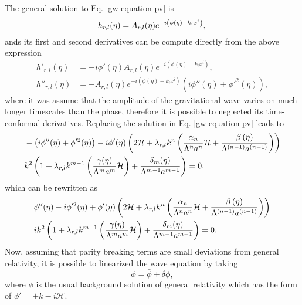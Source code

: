 \documentclass{article}
\begin{document}
The general solution to Eq. \eqref{gw equation pv} is
\begin{equation}
    h_{r,l}(\eta)  = A_{r,l}(\eta)e^{-i\left(\phi(\eta) -k_{i}x^{i}\right)}, \\
\end{equation} 
ands its first and second derivatives can be compute directly from the above expression 
\begin{align}
    h'_{r,l}(\eta) & = -i\phi'(\eta)A_{r,l}(\eta)e^{-i\left(\phi(\eta) -k_{i}x^{i}\right)}, \\
    h''_{r,l}(\eta) & = -A_{r,l}(\eta)e^{-i\left(\phi(\eta) -k_{i}x^{i}\right)} 
    \left(i\phi''(\eta) + \phi'^{2}(\eta)\right),
\end{align} 
where it was assume that the amplitude of the gravitational wave varies 
on much longer timescales than the phase, therefore it is possible to neglected its 
time-conformal derivatives. Replacing the solution in Eq. \eqref{gw equation pv} leads to
\begin{align}
    & -\left(i\phi''(\eta) + \phi'^{2}(\eta)\right) -i\phi'(\eta)
    \left(2\mathcal{H} + \lambda_{r,l}k^{n}
    \left(\frac{\alpha_{n}}{\Lambda^n a^n}\mathcal{H} + 
    \frac{\beta\left(\eta\right)}{\Lambda^{(n-1)}a^{(n-1)}}\right)\right) \notag \\
    & k^2 \left(1 + \lambda_{r,l}k^{m-1}
    \left(\frac{\gamma(\eta)}{\Lambda^m a^m}\mathcal{H}\right) 
    + \frac{\delta_{m}(\eta)}{\Lambda^{m-1}a^{m-1}}\right) = 0.
\end{align}
which can be rewritten as
\begin{align}
    & \phi''(\eta) - i\phi'^{2}(\eta) + \phi'(\eta)
    \left(2\mathcal{H} + \lambda_{r,l}k^{n}
    \left(\frac{\alpha_{n}}{\Lambda^n a^n}\mathcal{H} + 
    \frac{\beta\left(\eta\right)}{\Lambda^{(n-1)}a^{(n-1)}}\right)\right) \notag \\
    & i k^2 \left(1 + \lambda_{r,l}k^{m-1}
    \left(\frac{\gamma(\eta)}{\Lambda^m a^m}\mathcal{H}\right) 
    + \frac{\delta_{m}(\eta)}{\Lambda^{m-1}a^{m-1}}\right) = 0.
\end{align}
Now, assuming that parity breaking terms are small deviations from general relativity,
it is possible to linearized the wave equation by taking
\begin{equation}
    \phi = \bar{\phi} + \delta \phi,
\end{equation}
where $\bar{\phi}$ is the usual background solution of general relativity which has 
the form of $\bar{\phi} ' = \pm k - i\mathcal{H}$.



\end{document}
